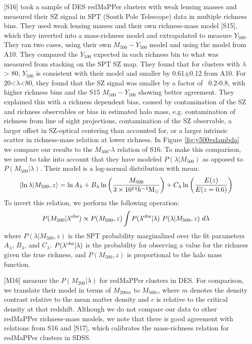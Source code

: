 \documentclass[a4paper,fleqn,usenatbib]{mnras}
\begin{document}
\cite{2016arXiv160508770S} [S16] took a sample of DES redMaPPer clusters with weak lensing masses and measured their SZ signal in SPT (South Pole Telescope) data in multiple richness bins. They used weak lensing masses and their own richness-mass model \citep{2015MNRAS.454.2305S} [S15], which they inverted into a mass-richness model and extrapolated to measure $Y_{500}$. They ran two cases, using their own $M_{500} - Y_{500}$ model and using the model from A10. They compared the $Y_{500}$ expected in each richness bin to what was measured from stacking on the SPT SZ map. They found that for clusters with $\lambda$ > 80, $Y_{500}$ is consistent with their model and smaller by 0.61$\pm$0.12 from A10. For 20<$\lambda$<80, they found that the SZ signal was smaller by a factor of ~0.2-0.8, with higher richness bins and the S15 $M_{500} - Y_{500}$ showing better agreement. They explained this with a richness dependent bias, caused by contamination of the SZ and richness observables or bias in estimated halo mass, e.g. contamination of richness from line of sight projections, contamination of the SZ observable, a larger offset in SZ-optical centering than accounted for, or a larger intrinsic scatter in richness-mass relation at lower richness.
In Figure \ref{fig:y500vslambda} we compare our results to the $M_{500}$-$\lambda$ relation of S16. To make this comparison, we need to take into account that they have modeled $P(\lambda|M_{500})$ as opposed to $P(M_{500}|\lambda)$. Their model is a log-normal distribution with mean:
\begin{equation}
\langle \ln\lambda | M_{500},z\rangle = \ln A_{\lambda} + B_{\lambda} \ln\bigg(\frac{M_{500}}{3 \times 10^{14}h^{-1}\rm M_{\odot}}\bigg) + C_{\lambda}\ln\bigg(\frac{E(z)}{E(z=0.6)}\bigg)
\end{equation}
To invert this relation, we perform the following operation:
\begin{equation}
P(M_{500}|\lambda^{\rm obs}) \propto P(M_{500},z) \int P(\lambda^{\rm obs}|\lambda) \  P(\lambda|M_{500},z) \ d\lambda
\end{equation}
where $P(\lambda|M_{500},z)$ is the SPT probability marginalized over the fit parameters $A_{\lambda}$, $B_{\lambda}$, and $C_{\lambda}$. $P(\lambda^{\rm obs}|\lambda)$ is the probability for observing a value for the richness given the true richness, and $P(M_{500},z)$ is proportional to the halo mass function. 


\cite{2016arXiv161006890M} [M16] measure the $P(M_{200}|\lambda)$ for redMaPPer clusters in DES. For comparison, we translate their model in terms of $M_{200m}$ to $M_{500c}$, where $m$ denotes the density contrast relative to the mean matter density and $c$ is relative to the critical density at that redshift. Although we do not compare our data to other redMaPPer richness-mass models, we note that there is good agreement with relations from S16 and \cite{2017MNRAS.466.3103S} [S17], which calibrates the mass-richness relation for redMaPPer clusters in SDSS.
\end{document}
